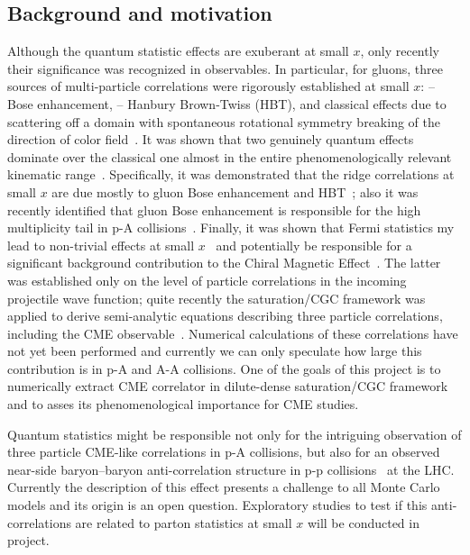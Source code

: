     \subsection{Background and motivation}
    \label{sec:p3b}
	Although the quantum statistic effects are exuberant at small $x$, 
	only recently their significance was recognized in observables. 
	In particular, 
	for gluons, three sources of multi-particle  correlations were rigorously established at 
	small $x$: -- Bose enhancement, -- Hanbury Brown-Twiss (HBT), and classical effects due to 
	scattering off a domain with spontaneous rotational symmetry breaking of the direction of 
	color field~\cite{Dumitru:2014yza,Dumitru:2014vka,Dumitru:2015cfa}. It was shown that two genuinely quantum effects dominate over the classical one 
	almost in the entire phenomenologically relevant kinematic range~\cite{Kovner:2018azs}.
	Specifically, it was demonstrated that the ridge correlations at small $x$ are 
	due mostly to gluon Bose enhancement and 
	HBT~\cite{Kovchegov:2013ewa,Kovchegov:2012nd,Altinoluk:2015uaa,Altinoluk:2018ogz,Kovner:2018fxj,Kovchegov:2018jun};
	also  it was recently identified 
	that gluon Bose enhancement is responsible for the high multiplicity tail in p-A collisions~\cite{Kovner:2018azs}. 
	Finally, it was shown that Fermi statistics my lead to non-trivial effects at small $x$~\cite{Altinoluk:2016vax,Kovner:2017ssr,Kovner:2018vec} 
and potentially be responsible for a significant background contribution to the Chiral Magnetic Effect~\cite{Kovner:2017gab}. 
	The latter was established only on the level of particle correlations in the incoming projectile wave function; 
	quite recently the saturation/CGC framework was applied to derive semi-analytic equations describing 
	three particle correlations, including the CME observable~\cite{Martinez:2018tuf}. Numerical calculations of these 
	correlations have not yet been performed and currently we can only speculate how large 
	this contribution is in p-A and A-A collisions. One of the goals of this project is to 
	numerically extract CME correlator in dilute-dense saturation/CGC framework and to asses its phenomenological importance 
	for CME studies. 

	Quantum statistics might be responsible not only for the intriguing observation of three particle CME-like correlations 
	in p-A collisions, but also for an observed near-side baryon--baryon anti-correlation structure in p-p 
	collisions~\cite{Adam:2016iwf} at the LHC. Currently the description of this effect presents a challenge 
	to all Monte Carlo models and its origin is an open question. Exploratory studies to test if this anti-correlations are 
    related to parton statistics at small $x$ will be conducted in project.  


